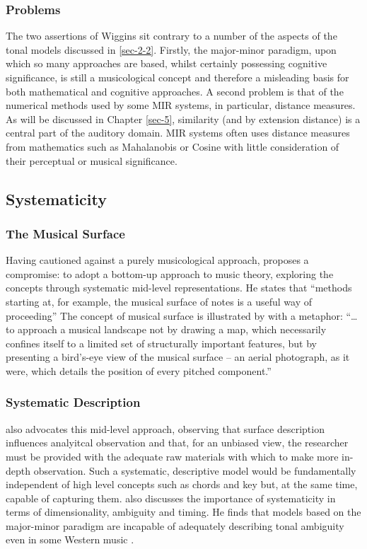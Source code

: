 \documentclass{article}
\begin{document}
\subsubsection{Problems}
\label{sec-2-3-3}

The two assertions of Wiggins sit contrary to a number of the aspects
of the tonal models discussed in \ref{sec-2-2}. Firstly, the
major-minor paradigm, upon which so many approaches are based, whilst
certainly possessing cognitive significance, is still a musicological
concept and therefore a misleading basis for both mathematical and
cognitive approaches. A second problem is that of the numerical
methods used by some MIR systems, in particular, distance measures. As
will be discussed in Chapter \ref{sec-5}, similarity
(and by extension distance) is a central part of the auditory
domain. MIR systems often uses distance measures from mathematics such
as Mahalanobis \citep{Tzanetakis1999} or Cosine \citep{Foote2000} with
little consideration of their perceptual or musical significance.
\subsection{Systematicity}
\label{sec-2-4}
\subsubsection{The Musical Surface}
\label{sec-2-4-1}

Having cautioned against a purely musicological approach,
\citet[pp. 481]{Wiggins2009} proposes a compromise: to adopt a
bottom-up approach to music theory, exploring the concepts through
systematic mid-level representations. He states that ``methods
starting at, for example, the musical surface of notes is a useful way
of proceeding'' The concept of musical surface is illustrated by
\citet[pp. 159]{Huovinen2007} with a metaphor: ``\ldots{}to approach a
musical landscape not by drawing a map, which necessarily confines
itself to a limited set of structurally important features, but by
presenting a bird’s-eye view of the musical surface – an aerial
photograph, as it were, which details the position of every pitched
component.''
\subsubsection{Systematic Description}
\label{sec-2-4-2}

\citet{Martorell2013} also advocates this mid-level approach,
observing that surface description influences analyitcal observation
and that, for an unbiased view, the researcher must be provided with
the adequate raw materials with which to make more in-depth
observation. Such a systematic, descriptive model would be
fundamentally independent of high level concepts such as chords and
key but, at the same time, capable of capturing
them. \citet{Martorell2013} also discusses the importance of
systematicity in terms of dimensionality, ambiguity and timing. He
finds that models based on the major-minor paradigm are incapable of
adequately describing tonal ambiguity even in some Western music
\citep[chap. 3]{Martorell2013}.
\end{document}
